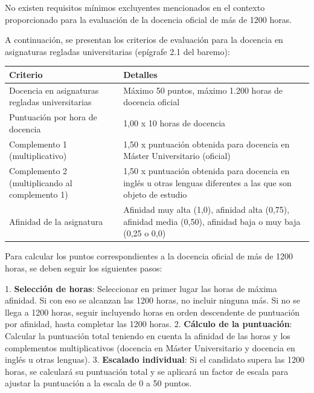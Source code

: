 \documentclass{article}
\begin{document}
\begin{itemize}
\begin{itemize}
                No existen requisitos mínimos excluyentes mencionados en el contexto proporcionado para la evaluación de la docencia oficial de más de 1200 horas.

                A continuación, se presentan los criterios de evaluación para la docencia en asignaturas regladas universitarias (epígrafe 2.1 del baremo):

                \vspace{0.4cm}
                \begin{table}[h!]\centering\renewcommand{\arraystretch}{1.3}
                  \begin{tabular}{|p{}|p{}|}\hline
                    Criterio                                        & Detalles                                                                                                      \\\hline
                    Docencia en asignaturas regladas universitarias & Máximo 50 puntos, máximo 1.200 horas de docencia oficial                                                      \\\hline
                    Puntuación por hora de docencia                 & 1,00 x 10 horas de docencia                                                                                   \\\hline
                    Complemento 1 (multiplicativo)                  & 1,50 x puntuación obtenida para docencia en Máster Universitario (oficial)                                    \\\hline
                    Complemento 2 (multiplicando al complemento 1)  & 1,50 x puntuación obtenida para docencia en inglés u otras lenguas diferentes a las que son objeto de estudio \\\hline
                    Afinidad de la asignatura                       & Afinidad muy alta (1,0), afinidad alta (0,75), afinidad media (0,50), afinidad baja o muy baja (0,25 o 0,0)   \\\hline
                  \end{tabular}\end{table}
                \vspace{0.4cm}

                Para calcular los puntos correspondientes a la docencia oficial de más de 1200 horas, se deben seguir los siguientes pasos:

                1. \textbf{Selección de horas}: Seleccionar en primer lugar las horas de máxima afinidad. Si con eso se alcanzan las 1200 horas, no incluir ninguna más. Si no se llega a 1200 horas, seguir incluyendo horas en orden descendente de puntuación por afinidad, hasta completar las 1200 horas.
                2. \textbf{Cálculo de la puntuación}: Calcular la puntuación total teniendo en cuenta la afinidad de las horas y los complementos multiplicativos (docencia en Máster Universitario y docencia en inglés u otras lenguas).
                3. \textbf{Escalado individual}: Si el candidato supera las 1200 horas, se calculará su puntuación total y se aplicará un factor de escala para ajustar la puntuación a la escala de 0 a 50 puntos.


\end{itemize}
\end{itemize}
\end{document}
